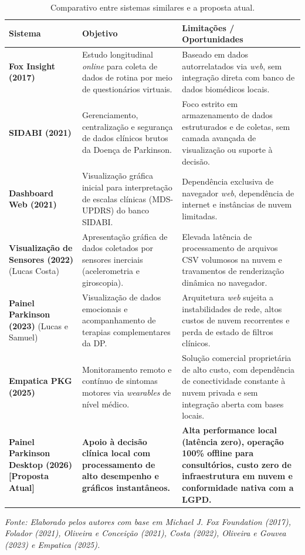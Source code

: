\begin{table}[htbp]
\centering
\caption{Comparativo entre sistemas similares e a proposta atual.}
\label{tab:sistemas_similares}
\begin{tabular}{|p{3.8cm}|p{5.2cm}|p{6.5cm}|}
\hline
\textbf{Sistema} & \textbf{Objetivo} & \textbf{Limitações / Oportunidades} \\ \hline
\textbf{Fox Insight (2017)} & Estudo longitudinal \textit{online} para coleta de dados de rotina por meio de questionários virtuais. & Baseado em dados autorrelatados via \textit{web}, sem integração direta com banco de dados biomédicos locais. \\ \hline
\textbf{SIDABI (2021)} & Gerenciamento, centralização e segurança de dados clínicos brutos da Doença de Parkinson. & Foco estrito em armazenamento de dados estruturados e de coletas, sem camada avançada de visualização ou suporte à decisão. \\ \hline
\textbf{Dashboard Web (2021)} & Visualização gráfica inicial para interpretação de escalas clínicas (MDS-UPDRS) do banco SIDABI. & Dependência exclusiva de navegador \textit{web}, dependência de internet e instâncias de nuvem limitadas. \\ \hline
\textbf{Visualização de Sensores (2022)} \newline (Lucas Costa) & Apresentação gráfica de dados coletados por sensores inerciais (acelerometria e giroscopia). & Elevada latência de processamento de arquivos CSV volumosos na nuvem e travamentos de renderização dinâmica no navegador. \\ \hline
\textbf{Painel Parkinson (2023)} \newline (Lucas e Samuel) & Visualização de dados emocionais e acompanhamento de terapias complementares da DP. & Arquitetura \textit{web} sujeita a instabilidades de rede, altos custos de nuvem recorrentes e perda de estado de filtros clínicos. \\ \hline
\textbf{Empatica PKG (2025)} & Monitoramento remoto e contínuo de sintomas motores via \textit{wearables} de nível médico. & Solução comercial proprietária de alto custo, com dependência de conectividade constante à nuvem privada e sem integração aberta com bases locais. \\ \hline
\textbf{Painel Parkinson Desktop (2026) [Proposta Atual]} & \textbf{Apoio à decisão clínica local com processamento de alto desempenho e gráficos instantâneos.} & \textbf{Alta performance local (latência zero), operação 100\% offline para consultórios, custo zero de infraestrutura em nuvem e conformidade nativa com a LGPD.} \\ \hline
\end{tabular}
\vspace{0.2cm}

\small{\textit{Fonte: Elaborado pelos autores com base em Michael J. Fox Foundation (2017), Folador (2021), Oliveira e Conceição (2021), Costa (2022), Oliveira e Gouvea (2023) e Empatica (2025).}}
\end{table}
